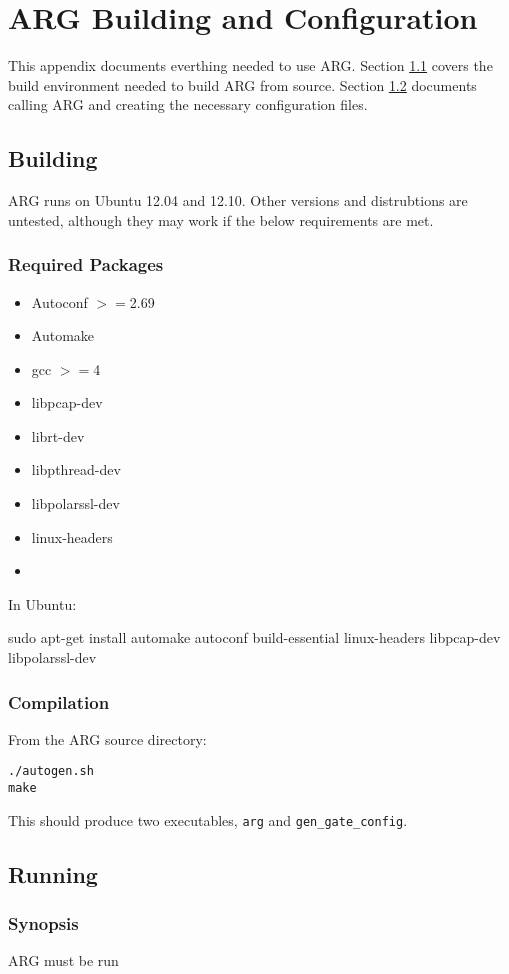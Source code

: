 \chapter{\ac{ARG} Building and Configuration}
\label{chp:argconf}

\par This appendix documents everthing needed to use \ac{ARG}. Section \ref{sec:arg_buildenv} covers the build environment needed to build \ac{ARG} from source. Section \ref{sec:arg_cmd} documents calling \ac{ARG} and creating the necessary configuration files.

\section{Building}
\label{sec:arg_buildenv}
\par \ac{ARG} runs on Ubuntu 12.04 and 12.10. Other versions and distrubtions are untested, although they may work if the below requirements are met. 

\subsection{Required Packages}
{\singlespace
\begin{itemize}
\item Autoconf $>=$2.69
\item Automake
\item gcc $>=$4
\item libpcap-dev
\item librt-dev
\item libpthread-dev
\item libpolarssl-dev
\item linux-headers

\item {}
\end{itemize}
}

\par In Ubuntu:
\begin{terminal}
sudo apt-get install automake autoconf build-essential linux-headers libpcap-dev libpolarssl-dev
\end{terminal}

\subsection{Compilation}
\par From the \ac{ARG} source directory:
\begin{verbatim}
./autogen.sh
make
\end{verbatim}

\par This should produce two executables, \texttt{arg} and \texttt{gen\_gate\_config}.

\section{Running}
\label{sec:arg_cmd}
\subsection{Synopsis}
\par \ac{ARG} must be run 

